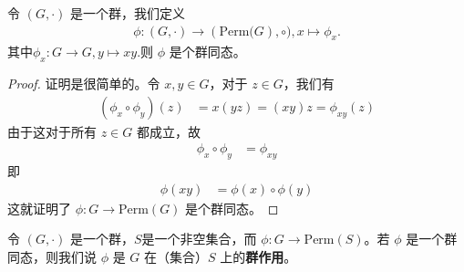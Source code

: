 \documentclass[../../main.tex]{subfiles}
\begin{document}
\begin{proposition}
令 \((G, \cdot)\) 是一个群，我们定义 
\begin{align*}
\phi :(G,\cdot )\rightarrow (\mathrm{Perm(}G),\circ ),x\mapsto \phi _x.
\end{align*}
其中$\phi _x:G\rightarrow G,y\mapsto xy$.则 \(\phi\) 是个群同态。
\end{proposition}
\begin{proof}
证明是很简单的。令 \(x, y \in G\)，对于 \(z \in G\)，我们有
\begin{align*}
(\phi_x \circ \phi_y)(z) &= x(yz) = (xy)z = \phi_{xy}(z)
\end{align*}
由于这对于所有 \(z \in G\) 都成立，故
\begin{align*}
\phi_x \circ \phi_y &= \phi_{xy}
\end{align*}
即
\begin{align*}
\phi(xy) &= \phi(x) \circ \phi(y)
\end{align*}
这就证明了 \(\phi: G \to \mathrm{Perm}(G)\) 是个群同态。 
\end{proof}

\begin{definition}[群作用]
令 \((G, \cdot)\) 是一个群，$S$是一个非空集合，而 \(\phi: G \to \mathrm{Perm}(S)\)。若 \(\phi\) 是一个群同态，则我们说 \(\phi\) 是 \(G\) 在（集合）\(S\) 上的\textbf{群作用}。
\end{definition}
\end{document}
